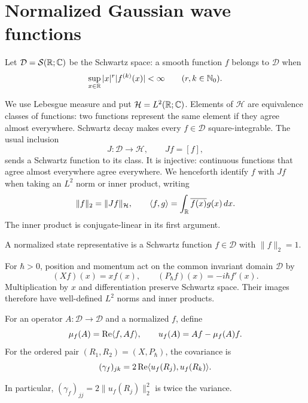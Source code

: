 \section{Normalized Gaussian wave functions}
\label{sec:states}
\begin{definition}\label{def:schwartz}
Let $\mathcal D=\mathcal S(\mathbb R;\mathbb C)$ be the Schwartz space: a smooth function $f$ belongs to
$\mathcal D$ when
\[
 \sup_{x\in\mathbb R}|x|^r|f^{(k)}(x)|<\infty
 \qquad (r,k\in\mathbb N_0).
\]
\end{definition}
We use Lebesgue measure and put $\mathcal H=L^2(\mathbb R;\mathbb C)$. Elements of $\mathcal H$ are equivalence classes of functions: two functions
represent the same element if they agree almost everywhere. Schwartz decay makes
every $f\in\mathcal D$ square-integrable. The usual inclusion
\[
 J:\mathcal D\longrightarrow\mathcal H,\qquad Jf=[f],
\]
sends a Schwartz function to its class. It is injective: continuous functions
that agree almost everywhere agree everywhere. We henceforth identify $f$ with $Jf$
when taking an $L^2$ norm or inner product, writing
\[
 \|f\|_2=\|Jf\|_{\mathcal H},\qquad
 \langle f,g\rangle=\int_\mathbb R\overline{f(x)}g(x)\,dx.
\]
The inner product is conjugate-linear in its first argument.

\begin{definition}\label{def:state}
A normalized state representative is a Schwartz function $f\in\mathcal D$
with $\|f\|_2=1$.
\end{definition}

For $\hbar>0$, position and momentum act on the common invariant domain
$\mathcal D$ by
\[
 (Xf)(x)=xf(x),\qquad (P_\hbar f)(x)=-i\hbar f'(x).
\]
Multiplication by $x$ and differentiation preserve Schwartz space. Their images
therefore have well-defined $L^2$ norms and inner products.

\begin{definition}\label{def:covariance}
For an operator
$A:\mathcal D\to\mathcal D$ and a normalized $f$, define
\[
 \mu_f(A)=\operatorname{Re}\langle f,Af\rangle,\qquad
 u_f(A)=Af-\mu_f(A)f.
\]
For the ordered pair $(R_1,R_2)=(X,P_\hbar)$, the covariance is
\begin{equation}\label{eq:state-covariance}
 (\gamma_f)_{jk}=2\operatorname{Re}\langle u_f(R_j),u_f(R_k)\rangle.
\end{equation}
\end{definition}
In particular, $(\gamma_f)_{jj}=2\|u_f(R_j)\|_2^2$ is twice the variance.

